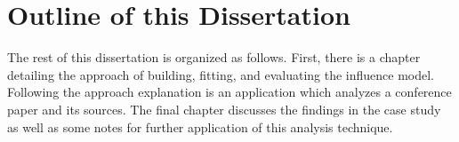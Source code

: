 \documentclass[../ut-dissertation.tex]{subfiles}
\begin{document}
\section{Outline of this Dissertation}
The rest of this dissertation is organized as follows.  First, there
is a chapter detailing the approach of building, fitting, and
evaluating the influence model.  Following the approach explanation
is an application which analyzes a conference paper and its sources.
The final chapter discusses the findings in the case
study as well as some notes for further application of this analysis
technique.
\end{document}
